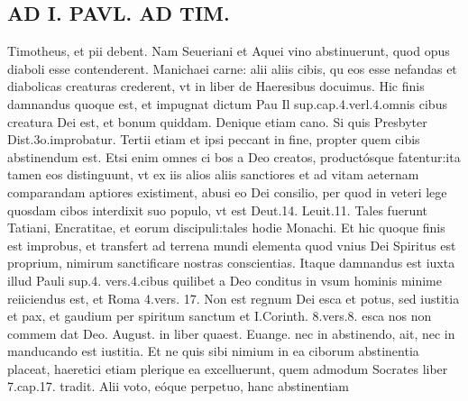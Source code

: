 \documentclass{article}
\begin{document}
\begin{pages}
\section*{AD I. PAVL. AD TIM. }
\marginpar{[ p.374 ]}\pstart Timotheus, et pii debent. Nam Seueriani et Aquei vino abstinuerunt, quod opus diaboli esse contenderent. Manichaei carne: alii aliis cibis, qu eos esse nefandas et diabolicas creaturas crederent, vt in liber  de Haeresibus docuimus. Hic finis damnandus quoque est, et impugnat dictum Pau Il sup.cap.4.verl.4.omnis cibus creatura Dei est, et bonum quiddam. Denique etiam cano. Si quis Presbyter Dist.3o.improbatur.  \pend\pstart Tertii etiam et ipsi peccant in fine, propter quem cibis abstinendum est. Etsi enim omnes ci bos a Deo creatos, productósque fatentur:ita tamen eos distinguunt, vt ex iis alios aliis sanctiores et ad vitam aeternam comparandam aptiores existiment, abusi eo Dei consilio, per quod in veteri lege quosdam cibos interdixit suo populo, vt est Deut.14. Leuit.11. Tales fuerunt Tatiani, Encratitae, et eorum discipuli:tales hodie Monachi. Et hic quoque finis est improbus, et transfert ad terrena mundi elementa quod vnius Dei Spiritus est proprium, nimirum sanctificare nostras conscientias. Itaque damnandus est iuxta illud Pauli sup.4. vers.4.cibus quilibet a Deo conditus in vsum hominis minime reiiciendus est, et Roma 4.vers. 17. Non est regnum Dei esca et potus, sed iustitia et pax, et gaudium per spiritum sanctum et I.Corinth. 8.vers.8. esca nos non commem dat Deo. August. in liber  quaest. Euange. nec in abstinendo, ait, nec in manducando est iustitia. Et ne quis sibi nimium in ea ciborum abstinentia placeat, haeretici etiam plerique ea excelluerunt, quem admodum Socrates liber 7.cap.17. tradit.  \pend\pstart Alii voto, eóque perpetuo, hanc abstinentiam  \pend

\end{pages}
\end{document}
